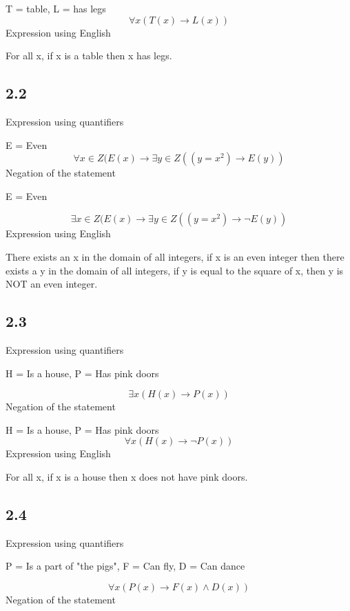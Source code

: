 \documentclass[a4paper,11pt]{article}
\begin{document}
T = table, L = has legs
\begin{equation}
    \forall x(T(x) \to L(x))
\end{equation}
Expression using English

For all x,
if x is a table
then x has legs.

\subsection*{2.2}
Expression using quantifiers

E = Even
\begin{equation}
    \forall x \in Z(E(x) \to \exists y \in Z((y = x^{2}) \to E(y))
\end{equation}
Negation of the statement

E = Even

\begin{equation}
    \exists x \in Z(E(x) \to \exists y \in Z((y = x^{2}) \to \neg E(y))
\end{equation}
Expression using English

There exists an x in the domain of all integers,
if x is an even integer
then there exists a y in the domain of all integers,
if y is equal to the square of x,
then y is NOT an even integer.

\subsection*{2.3}
Expression using quantifiers

H = Is a house, P = Has pink doors

\begin{equation}
    \exists x ( H(x) \to P(x) )
\end{equation}
Negation of the statement

H = Is a house, P = Has pink doors
\begin{equation}
    \forall x (H(x) \to \neg P(x))
\end{equation}
Expression using English

For all x,
if x is a house
then x does not have pink doors.

\subsection*{2.4}
Expression using quantifiers

P = Is a part of "the pigs", F = Can fly, D = Can dance

\begin{equation}
    \forall x( P(x) \to F(x) \land D(x) )
\end{equation}
Negation of the statement
\end{document}
